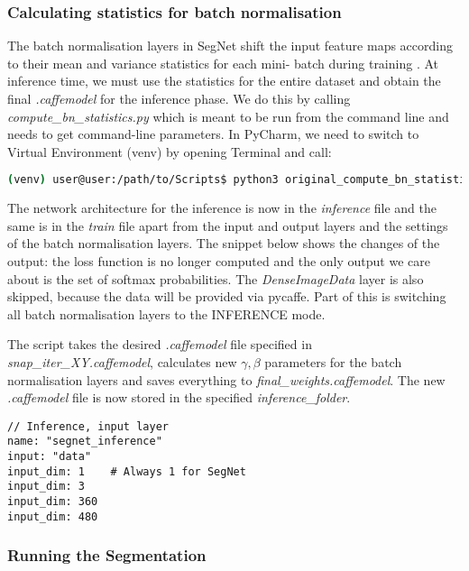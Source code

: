 \subsubsection{Calculating statistics for batch normalisation}
The batch normalisation layers in SegNet shift the input feature maps according to their mean and variance statistics for each mini- batch during training \cite{mehlig}. At inference time, we must use the statistics for the entire dataset and obtain the final \textit{.caffemodel} for the inference phase. \cite{segnet_get_started} We do this by calling \textit{compute\_bn\_statistics.py} which is meant to be run from the command line and needs to get command-line parameters. In PyCharm, we need to switch to Virtual Environment (venv) by opening Terminal and call:

\begin{lstlisting}[language=bash]
(venv) user@user:/path/to/Scripts$ python3 original_compute_bn_statistics.py /path/to/train.prototxt /path/to/snap_iter_XY.caffemodel /path/to/inference_folder
\end{lstlisting}

The network architecture for the inference is now in the \textit{inference} file and the same is in the \textit{train} file apart from the input and output layers and the settings of the batch normalisation layers. The snippet below shows the changes of the output: the loss function is no longer computed and the only output we care about is the set of softmax probabilities. The \textit{DenseImageData} layer is also skipped, because the data will be provided via pycaffe. Part of this is switching all batch normalisation layers to the INFERENCE mode. \cite{issue}

The script takes the desired \textit{.caffemodel} file specified in \textit{snap\_iter\_XY.caffemodel}, calculates new $ \gamma, \beta $ parameters for the batch normalisation layers and saves everything to \textit{final\_weights.caffemodel}. The new \textit{.caffemodel} file is now stored in the specified \textit{inference\_folder}. \cite{issue}

\begin{lstlisting}[caption={Replacing input layer type in \textit{inference.prototxt} \cite{filip_github}},captionpos=b]
// Inference, input layer
name: "segnet_inference"
input: "data"
input_dim: 1	# Always 1 for SegNet
input_dim: 3
input_dim: 360
input_dim: 480
\end{lstlisting}

\subsubsection{Running the Segmentation}

